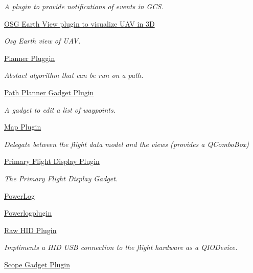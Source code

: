 \begin{DoxyCompactItemize}
\begin{DoxyCompactList}\small\item\em \-A plugin to provide notifications of events in \-G\-C\-S. \end{DoxyCompactList}\item 
\hyperlink{group___o_s_g_earth_view_pluging}{\-O\-S\-G Earth View plugin to visualize U\-A\-V in 3\-D}
\begin{DoxyCompactList}\small\item\em \-Osg \-Earth view of \-U\-A\-V. \end{DoxyCompactList}\item 
\hyperlink{group___path}{\-Planner Pluggin}
\begin{DoxyCompactList}\small\item\em \-Abstact algorithm that can be run on a path. \end{DoxyCompactList}\item 
\hyperlink{group___path_planner_gadget_plugin}{\-Path Planner Gadget Plugin}
\begin{DoxyCompactList}\small\item\em \-A gadget to edit a list of waypoints. \end{DoxyCompactList}\item 
\hyperlink{group___path_planner}{\-Map Plugin}
\begin{DoxyCompactList}\small\item\em \-Delegate between the flight data model and the views (provides a \-Q\-Combo\-Box) \end{DoxyCompactList}\item 
\hyperlink{group___p_f_d_plugin}{\-Primary Flight Display Plugin}
\begin{DoxyCompactList}\small\item\em \-The \-Primary \-Flight \-Display \-Gadget. \end{DoxyCompactList}\item 
\hyperlink{group___power_log}{\-Power\-Log}
\item 
\hyperlink{group__powerlogplugin}{\-Powerlogplugin}
\item 
\hyperlink{group___raw_h_i_d_plugin}{\-Raw H\-I\-D Plugin}
\begin{DoxyCompactList}\small\item\em \-Impliments a \-H\-I\-D \-U\-S\-B connection to the flight hardware as a \-Q\-I\-O\-Device. \end{DoxyCompactList}\item 
\hyperlink{group___scope_plugin}{\-Scope Gadget Plugin}

\end{DoxyCompactItemize}
